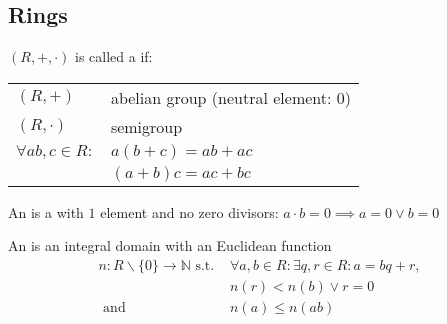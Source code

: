 




\subsection{Rings}
\begin{definition}
$(R,+,\cdot)$ is called a  if:

\begin{center}
\begin{tabular}{ll}
  $(R,+)$ & abelian group (neutral element: 0)\\
  $(R,\cdot)$ & semigroup \\
  $\forall ab,c \in R:$ & $a(b+c) = ab+ac$\\
                        & $(a+b)c = ac+bc$\\
\end{tabular}
\end{center}
\end{definition}

\begin{definition}
An  is a  with $1$ element and no zero divisors: $a\cdot b = 0 \implies a=0 \lor b = 0$
\end{definition}

\begin{definition}
An  is an integral domain with an Euclidean function
\begin{align*}
  n: R \backslash \{0\} \rightarrow \mathbb{N} \text{ s.t. } &\forall a,b \in R: \exists q,r \in R: a = bq + r, \\
  &n(r) < n(b) \lor r=0 \\
  \text{ and } &n(a) \leq n(ab)
\end{align*}
\end{definition}

